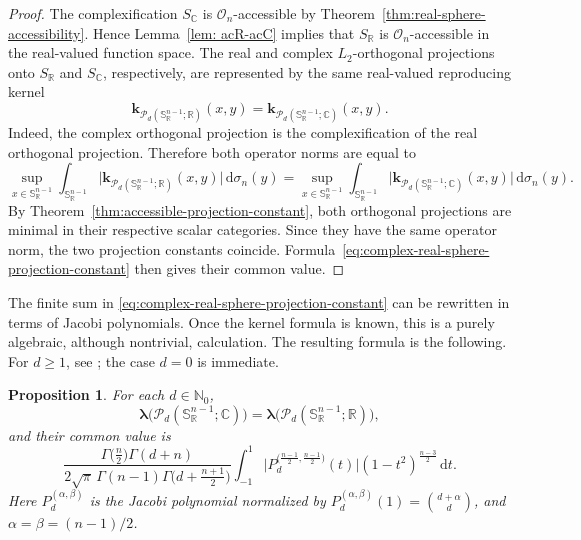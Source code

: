 \documentclass[11pt,showkeys]{amsart}
\newtheorem{proposition}[theorem]{Proposition}
\begin{document}
\begin{proof}
The complexification $S_{\mathbb C}$ is $\mathcal O_n$-accessible by
Theorem~\ref{thm:real-sphere-accessibility}. Hence Lemma~\ref{lem: acR-acC} implies that
$S_{\mathbb R}$ is $\mathcal O_n$-accessible in the real-valued function
space.
The real and complex $L_2$-orthogonal projections onto $S_{\mathbb R}$ and
$S_{\mathbb C}$, respectively, are represented by the same real-valued
reproducing kernel
\[
\mathbf k_{\mathcal P_d(\mathbb S_{\mathbb R}^{n-1};\mathbb R)}(x,y)
=
\mathbf k_{\mathcal P_d(\mathbb S_{\mathbb R}^{n-1};\mathbb C)}(x,y).
\]
Indeed, the complex orthogonal projection is the complexification of the real
orthogonal projection. Therefore both operator norms are equal to
\[
\sup_{x\in\mathbb S_{\mathbb R}^{n-1}}
\int_{\mathbb S_{\mathbb R}^{n-1}}
\bigl|
\mathbf k_{\mathcal P_d(\mathbb S_{\mathbb R}^{n-1};\mathbb R)}(x,y)
\bigr|
\,\mathrm{d}\sigma_n(y)
=
\sup_{x\in\mathbb S_{\mathbb R}^{n-1}}
\int_{\mathbb S_{\mathbb R}^{n-1}}
\bigl|
\mathbf k_{\mathcal P_d(\mathbb S_{\mathbb R}^{n-1};\mathbb C)}(x,y)
\bigr|
\,\mathrm{d}\sigma_n(y).
\]
By Theorem~\ref{thm:accessible-projection-constant}, both orthogonal projections are minimal in their
respective scalar categories. Since they have the same operator norm,
the two projection constants coincide.
Formula~\eqref{eq:complex-real-sphere-projection-constant} then gives their
common value.
\end{proof}

The finite sum in \eqref{eq:complex-real-sphere-projection-constant} can be
rewritten in terms of Jacobi polynomials. Once the kernel formula is known,
this is a purely algebraic, although nontrivial, calculation. The resulting
formula is the following. For $d\geq1$, see
\cite[Proposition~4.5 and Theorem~4.6]{defant2026minimal}; the case $d=0$ is immediate.

\begin{proposition}
\label{prop:jacobi-projection-formula}
For each $d\in\mathbb N_0$,
\[
\boldsymbol \lambda\bigl(\mathcal P_d(\mathbb S_{\mathbb R}^{n-1};\mathbb C)\bigr)
=
\boldsymbol \lambda\bigl(\mathcal P_d(\mathbb S_{\mathbb R}^{n-1};\mathbb R)\bigr),
\]
and their common value is
\[
\frac{
\Gamma\bigl(\frac n2\bigr)\Gamma(d+n)}
{2\sqrt{\pi}\,\Gamma(n-1)
\Gamma\bigl(d+\frac{n+1}{2}\bigr)}
\int_{-1}^{1}
\bigg|
P_d^{\bigl(\frac{n-1}{2},\frac{n-1}{2}\bigr)}(t)
\bigg|
(1-t^2)^{\frac{n-3}{2}}
\,\mathrm{d} t.
\]
Here \(P_d^{(\alpha,\beta)}\) is the Jacobi polynomial normalized by
\(P_d^{(\alpha,\beta)}(1)=\binom{d+\alpha}{d}\), and
\(\alpha=\beta=(n-1)/2\).
\end{proposition}
\end{document}
